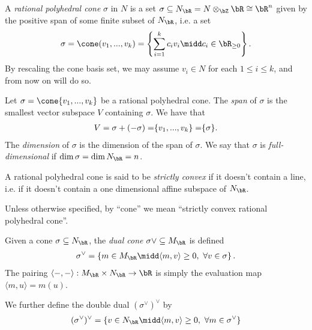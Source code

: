 \begin{defn}\label{defn:rational-poly-cone}
	A \emph{rational polyhedral cone} $\sigma$ in $N$ is a set $\sigma \subseteq N_\bR = N \otimes_\bZ\bR \cong \bR^n$ given by the positive span of some finite subset of $N_\bR$, i.e. a set
	\begin{align*}
		\sigma = \cone(v_1,...,v_k) = \left\{\sum_{i=1}^{k}c_iv_i \midd c_i \in \bR_{\geq 0}\right\}.
	\end{align*}
	By rescaling the cone basis set, we may assume $v_i \in N$ for each $1\leq i\leq k$, and from now on will do so.
\end{defn}
\begin{defn}\label{defn:span-dim-of-cone}
	Let $\sigma = \cone\{v_1, ...,v_k\}$ be a rational polyhedral cone. The \emph{span} of $\sigma$ is the smallest vector subspace $V$ containing $\sigma$. We have that
	\begin{align*}
		V = \sigma + (-\sigma) = \span\{v_1,...,v_k\} = \span\{\sigma\}.
	\end{align*}
	The \emph{dimension} of $\sigma$ is the dimension of the span of $\sigma$. We say that $\sigma$ is \emph{full-dimensional} if $\dim \sigma = \dim N_\bR = n$. 
\end{defn}
\begin{defn}\label{defn:strictly-convex}
	A rational polyhedral cone is said to be \emph{strictly convex} if it doesn't contain a line, i.e. if it doesn't contain a one dimensional affine subspace of $N_\bR$.

	Unless otherwise specified, by ``cone'' we mean ``strictly convex rational polyhedral cone''.
\end{defn}
\begin{defn}\label{defn:dual-cone}
	Given a cone $\sigma \subseteq N_\bR$, the \emph{dual cone} $\sigma\vee \subseteq M_\bR$ is defined
	\begin{align*}
		\sigma^{\vee} = \left\{m \in M_\bR \midd \langle m,v\rangle \geq 0, ~\forall v \in \sigma\right\}.
	\end{align*}
	The pairing $\langle -,-\rangle: M_\bR \times N_\bR \to \bR$ is simply the evaluation map $\langle m,u\rangle = m(u)$.

	We further define the double dual $(\sigma^{\vee})^{\vee}$ by
	\begin{align*}
		(\sigma^{\vee})^{\vee} = \left\{v \in N_\bR \midd \langle m,v\rangle \geq 0, ~ \forall m \in \sigma^{\vee}\right\} 
	\end{align*}
\end{defn}
